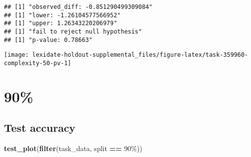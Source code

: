 \documentclass[
]{book}
\newenvironment{Shaded}{\begin{snugshade}}{\end{snugshade}}
\newcommand{\AttributeTok}[1]{\textcolor[rgb]{0.13,0.29,0.53}{#1}}
\newcommand{\DecValTok}[1]{\textcolor[rgb]{0.00,0.00,0.81}{#1}}
\newcommand{\FunctionTok}[1]{\textcolor[rgb]{0.13,0.29,0.53}{\textbf{#1}}}
\newcommand{\NormalTok}[1]{#1}
\newcommand{\OtherTok}[1]{\textcolor[rgb]{0.56,0.35,0.01}{#1}}
\newcommand{\SpecialCharTok}[1]{\textcolor[rgb]{0.81,0.36,0.00}{\textbf{#1}}}
\newcommand{\StringTok}[1]{\textcolor[rgb]{0.31,0.60,0.02}{#1}}
\begin{document}
\begin{Shaded}
\end{Shaded}

\begin{verbatim}
## [1] "observed_diff: -0.851290499309084"
## [1] "lower: -1.26104577566952"
## [1] "upper: 1.26343220206979"
## [1] "fail to reject null hypothesis"
## [1] "p-value: 0.78663"
\end{verbatim}

\texttt{[image: lexidate-holdout-supplemental\_files/figure-latex/task-359960-complexity-50-pv-1]}

\hypertarget{section-48}{%
\section{90\%}\label{section-48}}

\hypertarget{test-accuracy-48}{%
\subsection{Test accuracy}\label{test-accuracy-48}}

\begin{Shaded}
\begin{Highlighting}[]
\FunctionTok{test\_plot}\NormalTok{(}\FunctionTok{filter}\NormalTok{(task\_data, split }\SpecialCharTok{==} \StringTok{\textquotesingle{}90\%\textquotesingle{}}\NormalTok{))}
\end{Highlighting}
\end{Shaded}
\end{document}
